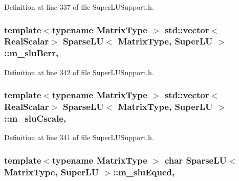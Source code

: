 Definition at line 337 of file Super\-L\-U\-Support.\-h.

\hypertarget{class_sparse_l_u_3_01_matrix_type_00_01_super_l_u_01_4_a66623b8295795f38f19148833f5d5798}{
\subsubsection[{m\-\_\-slu\-Berr}]{\setlength{\rightskip}{0pt plus 5cm}template$<$typename Matrix\-Type $>$ std\-::vector$<${\bf Real\-Scalar}$>$ {\bf Sparse\-L\-U}$<$ Matrix\-Type, {\bf Super\-L\-U} $>$\-::m\-\_\-slu\-Berr\hspace{0.3cm}{\ttfamily [mutable]}, {\ttfamily [protected]}}}\label{class_sparse_l_u_3_01_matrix_type_00_01_super_l_u_01_4_a66623b8295795f38f19148833f5d5798}


Definition at line 342 of file Super\-L\-U\-Support.\-h.

\hypertarget{class_sparse_l_u_3_01_matrix_type_00_01_super_l_u_01_4_a9316b254caf60cd7ea59de49161633aa}{
\subsubsection[{m\-\_\-slu\-Cscale}]{\setlength{\rightskip}{0pt plus 5cm}template$<$typename Matrix\-Type $>$ std\-::vector$<${\bf Real\-Scalar}$>$ {\bf Sparse\-L\-U}$<$ Matrix\-Type, {\bf Super\-L\-U} $>$\-::m\-\_\-slu\-Cscale\hspace{0.3cm}{\ttfamily [mutable]}, {\ttfamily [protected]}}}\label{class_sparse_l_u_3_01_matrix_type_00_01_super_l_u_01_4_a9316b254caf60cd7ea59de49161633aa}


Definition at line 341 of file Super\-L\-U\-Support.\-h.

\hypertarget{class_sparse_l_u_3_01_matrix_type_00_01_super_l_u_01_4_a909b219339c648af7221c00ded94e80f}{
\subsubsection[{m\-\_\-slu\-Equed}]{\setlength{\rightskip}{0pt plus 5cm}template$<$typename Matrix\-Type $>$ char {\bf Sparse\-L\-U}$<$ Matrix\-Type, {\bf Super\-L\-U} $>$\-::m\-\_\-slu\-Equed\hspace{0.3cm}{\ttfamily [mutable]}, {\ttfamily [protected]}}}\label{class_sparse_l_u_3_01_matrix_type_00_01_super_l_u_01_4_a909b219339c648af7221c00ded94e80f}



